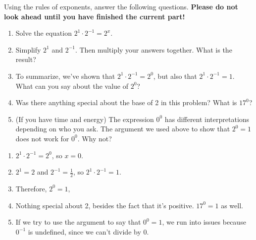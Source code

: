 \documentclass[noauthor]{ximera}
\begin{document}
\begin{problem}
Using the rules of exponents, answer the following questions.
\textbf{Please do not look ahead until you have finished the current part!}

\begin{enumerate}
    \item Solve the equation \(2^1 \cdot 2^{-1} = 2^x\).
    \item Simplify \(2^1\) and \(2^{-1}\). Then multiply your answers together.
    What is the result?
    \item To summarize, we've shown that \(2^1 \cdot 2^{-1} = 2^0\), but
    also that \(2^1 \cdot 2^{-1} = 1\). What can you say about the value
    of \(2^0\)?
    \item Was there anything special about the base of 2 in this
    problem? What is \(17^0\)?
    \item (If you have time and energy) The expression \(0^0\) has 
    different interpretations depending on who you ask. The argument
    we used above to show that \(2^0 = 1\) does not work for \(0^0\).
    Why not?
\end{enumerate}

\begin{explanation}
    \begin{enumerate}
        \item \(2^1 \cdot 2^{-1} = 2^0\), so \(x = 0\).
        \item \(2^1 = 2\) and \(2^{-1} = \frac{1}{2}\), so \(2^1 \cdot 2^{-1} = 1\).
        \item Therefore, \(2^0 = 1\),
        \item Nothing special about 2, besides the fact that it's positive. \(17^0 = 1\) as well.
        \item If we try to use the argument to say that \(0^0 = 1\), we run into issues because \(0^{-1}\) is undefined,
        since we can't divide by 0.
    \end{enumerate}
\end{explanation}
\end{problem}
\end{document}

